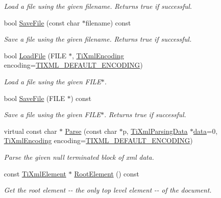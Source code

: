 \begin{DoxyCompactItemize}
\begin{DoxyCompactList}\small\item\em Load a file using the given filename. Returns true if successful. \end{DoxyCompactList}\item 
bool \hyperlink{class_ti_xml_document_ae869f5ebf7fc54c4a1d737fb4689fd44}{SaveFile} (const char $\ast$filename) const 
\begin{DoxyCompactList}\small\item\em Save a file using the given filename. Returns true if successful. \end{DoxyCompactList}\item 
bool \hyperlink{class_ti_xml_document_a41f6fe7200864d1dca663d230caf8db6}{LoadFile} (FILE $\ast$, \hyperlink{tinyxml_8h_a88d51847a13ee0f4b4d320d03d2c4d96}{TiXmlEncoding} encoding=\hyperlink{tinyxml_8h_ad5b8b092878e9010d6400cb6c13d4879}{TIXML\_\-DEFAULT\_\-ENCODING})
\begin{DoxyCompactList}\small\item\em Load a file using the given FILE$\ast$. \end{DoxyCompactList}\item 
bool \hyperlink{class_ti_xml_document_acf1672b4538c6d1d441f9f108aea2bf4}{SaveFile} (FILE $\ast$) const 
\begin{DoxyCompactList}\small\item\em Save a file using the given FILE$\ast$. Returns true if successful. \end{DoxyCompactList}\item 
virtual const char $\ast$ \hyperlink{class_ti_xml_document_a789ad2f06f93d52bdb5570b2f3670289}{Parse} (const char $\ast$p, \hyperlink{class_ti_xml_parsing_data}{TiXmlParsingData} $\ast$\hyperlink{bootstrap_8cc_a923b2158227405b9f7a6eceb6c7104c8}{data}=0, \hyperlink{tinyxml_8h_a88d51847a13ee0f4b4d320d03d2c4d96}{TiXmlEncoding} encoding=\hyperlink{tinyxml_8h_ad5b8b092878e9010d6400cb6c13d4879}{TIXML\_\-DEFAULT\_\-ENCODING})
\begin{DoxyCompactList}\small\item\em Parse the given null terminated block of xml data. \end{DoxyCompactList}\item 
const \hyperlink{class_ti_xml_element}{TiXmlElement} $\ast$ \hyperlink{class_ti_xml_document_ad09d17927f908f40efb406af2fb873be}{RootElement} () const 
\begin{DoxyCompactList}\small\item\em Get the root element -\/-\/ the only top level element -\/-\/ of the document. \end{DoxyCompactList}\item 

\end{DoxyCompactItemize}
